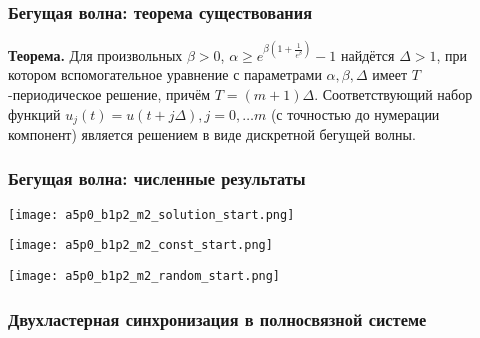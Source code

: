 \begin{frame}
	\frametitle{Бегущая волна: теорема существования}
	
	\textbf{Теорема.} 
	Для произвольных $\beta > 0$, $\alpha \geqslant e^{\beta\left(1 + \frac{1}{e^{\beta}}\right)} - 1$ найдётся $\Delta > 1$, при котором вспомогательное уравнение с параметрами $\alpha, \beta, \Delta$ имеет $T$-периодическое решение, причём $T = (m + 1) \Delta$. Соответствующий набор функций $u_j(t) = u(t + j \Delta), j = 0, \ldots m$ (с точностью до нумерации компонент) является решением в виде дискретной бегущей волны.
\end{frame}

\begin{frame}
	\frametitle{Бегущая волна: численные результаты}
	
	\begin{center}
		\texttt{[image: a5p0\_b1p2\_m2\_solution\_start.png]}
		
		\texttt{[image: a5p0\_b1p2\_m2\_const\_start.png]}
		
		\texttt{[image: a5p0\_b1p2\_m2\_random\_start.png]}
	\end{center}
\end{frame}

\begin{frame}
	\frametitle{Двухластерная синхронизация в полносвязной системе}
	
\end{frame}

